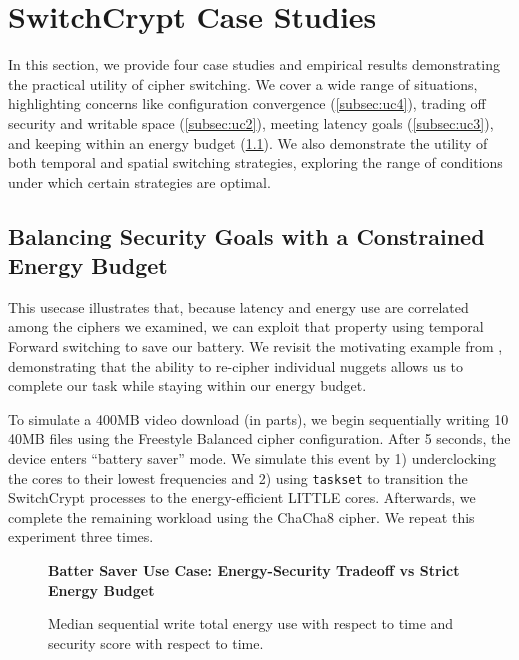 \section{SwitchCrypt Case Studies}\label{sec:usecases}

In this section, we provide four case studies and empirical results
demonstrating the practical utility of cipher switching. We cover a wide range
of situations, highlighting concerns like configuration convergence
(\cref{subsec:uc4}), trading off security and writable space
(\cref{subsec:uc2}), meeting latency goals (\cref{subsec:uc3}), and keeping
within an energy budget (\cref{subsec:uc1}). We also demonstrate the utility of
both temporal and spatial switching strategies, exploring the range of
conditions under which certain strategies are optimal.

\subsection{Balancing Security Goals with a Constrained Energy Budget}\label{subsec:uc1}

This usecase illustrates that, because latency and energy use are correlated
among the ciphers we examined, we can exploit that property using temporal
Forward switching to save our battery. We revisit the motivating example from
, demonstrating that the ability to re-cipher individual
nuggets allows us to complete our task while staying within our energy budget.

To simulate a 400MB video download (in parts), we begin sequentially writing 10
40MB files using the Freestyle Balanced cipher configuration. After 5 seconds,
the device enters ``battery saver'' mode. We simulate this event by 1)
underclocking the cores to their lowest frequencies and 2) using
\texttt{taskset} to transition the SwitchCrypt processes to the energy-efficient
LITTLE cores. Afterwards, we complete the remaining workload using the ChaCha8
cipher. We repeat this experiment three times.

\begin{figure}[ht] \textbf{Batter Saver Use Case: Energy-Security Tradeoff vs
   Strict Energy Budget}\par\medskip
   \centering
   {} \caption{Median sequential write total
   energy use with respect to time and security score with respect to time.}
  \label{fig:usecase-battery}
\end{figure}

